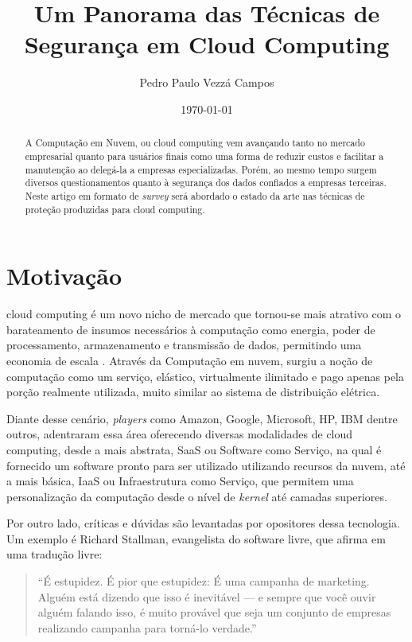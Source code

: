 \documentclass[brazil,12pt]{article}
\begin{document}
\title{Um Panorama das Técnicas de Segurança em Cloud Computing}
\author{Pedro Paulo Vezzá Campos}
\date{\today}
\maketitle

\begin{abstract}
A Computação em Nuvem, ou cloud computing vem avançando tanto no mercado
empresarial quanto para usuários finais como uma forma de
reduzir custos e facilitar a manutenção ao delegá-la a empresas especializadas.
Porém, ao mesmo tempo surgem diversos questionamentos quanto à segurança dos dados confiados a
empresas terceiras. Neste artigo em formato de \emph{survey} será abordado o
estado da arte nas técnicas de proteção produzidas para cloud computing.  
\end{abstract}

\section{Motivação}
cloud computing é um novo nicho de mercado que tornou-se mais atrativo com o
barateamento de insumos necessários à computação como energia, poder de
processamento, armazenamento e transmissão de dados, permitindo uma economia de
escala \cite{above-clouds}. Através da Computação em nuvem, surgiu a noção de
computação como um serviço, elástico, virtualmente ilimitado e pago apenas pela
porção realmente utilizada, muito similar ao sistema de distribuição elétrica.

Diante desse cenário, \emph{players} como Amazon, Google,
Microsoft, HP, IBM dentre outros, adentraram essa área oferecendo diversas
modalidades de cloud computing, desde a mais abstrata, SaaS ou Software como
Serviço, na qual é fornecido um software pronto para ser utilizado utilizando
recursos da nuvem, até a mais básica, IaaS ou Infraestrutura como Serviço, que
permitem uma personalização da computação desde o nível de \emph{kernel} até
camadas superiores.

Por outro lado, críticas e dúvidas são levantadas por opositores dessa
tecnologia. Um exemplo é Richard Stallman, evangelista do software livre, que
afirma em uma tradução livre:

\begin{quote}
``É estupidez. É pior que estupidez: É uma campanha de marketing. Alguém está
dizendo que isso é inevitável — e sempre que você ouvir alguém falando isso, é
muito provável que seja um conjunto de empresas realizando campanha para
torná-lo verdade.'' \cite{stallman-cloud}
\end{quote}
\end{document}
